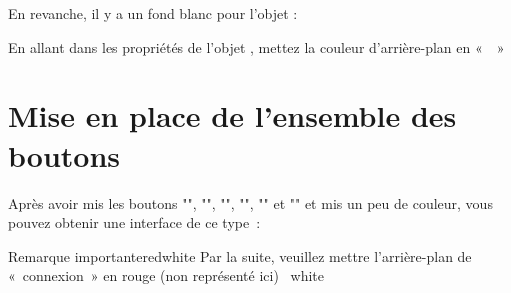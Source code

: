 En revanche, il y a un fond blanc pour l'objet 
:


En allant dans les {\color{green}propriétés} de l'objet , mettez la couleur d'arrière-plan en «  »


\section{Mise en place de l'ensemble des boutons}

Après avoir mis les boutons "", "", "", "", "" et "" et mis un peu de couleur, vous pouvez obtenir une interface de ce type :


\begin{messageBox}{Remarque importante}{red}{white}{
Par la suite, veuillez mettre l'arrière-plan de « connexion » en rouge (non représenté ici) 
}{white}
\end{messageBox}




